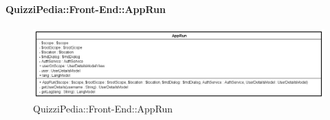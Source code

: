 	\paragraph{QuizziPedia::Front-End::AppRun}
		
		\label{QuizziPedia::Front-End::AppRun}
		
		\begin{figure}[ht]
			\centering
			\includegraphics[scale=0.5,keepaspectratio]{UML/Classi/Front-End/QuizziPedia_Front-end_AppRun.png}
			\caption{QuizziPedia::Front-End::AppRun}
		\end{figure} \FloatBarrier
		
